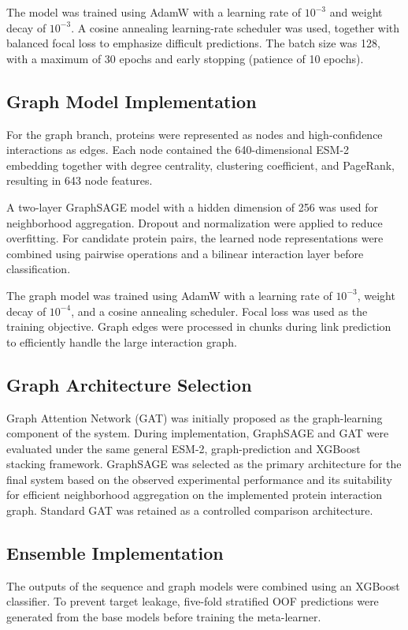 \documentclass[conference]{IEEEtran}
\begin{document}
The model was trained using AdamW with a learning rate of $10^{-3}$ and weight
decay of $10^{-3}$. A cosine annealing learning-rate scheduler was used,
together with balanced focal loss to emphasize difficult predictions. The batch
size was 128, with a maximum of 30 epochs and early stopping (patience of 10
epochs).

\subsection{Graph Model Implementation}
For the graph branch, proteins were represented as nodes and high-confidence
interactions as edges. Each node contained the 640-dimensional ESM-2 embedding
together with degree centrality, clustering coefficient, and PageRank,
resulting in 643 node features.

A two-layer GraphSAGE model with a hidden dimension of 256 was used for
neighborhood aggregation. Dropout and normalization were applied to reduce
overfitting. For candidate protein pairs, the learned node representations were
combined using pairwise operations and a bilinear interaction layer before
classification.

The graph model was trained using AdamW with a learning rate of $10^{-3}$,
weight decay of $10^{-4}$, and a cosine annealing scheduler. Focal loss was
used as the training objective. Graph edges were processed in chunks during
link prediction to efficiently handle the large interaction graph.

\subsection{Graph Architecture Selection}
Graph Attention Network (GAT) was initially proposed as the graph-learning
component of the system. During implementation, GraphSAGE and GAT were evaluated
under the same general ESM-2, graph-prediction and XGBoost stacking framework.
GraphSAGE was selected as the primary architecture for the final system based on
the observed experimental performance and its suitability for efficient
neighborhood aggregation on the implemented protein interaction graph. Standard
GAT was retained as a controlled comparison architecture.

\subsection{Ensemble Implementation}
The outputs of the sequence and graph models were combined using an XGBoost
classifier. To prevent target leakage, five-fold stratified OOF predictions
were generated from the base models before training the meta-learner.
\end{document}

